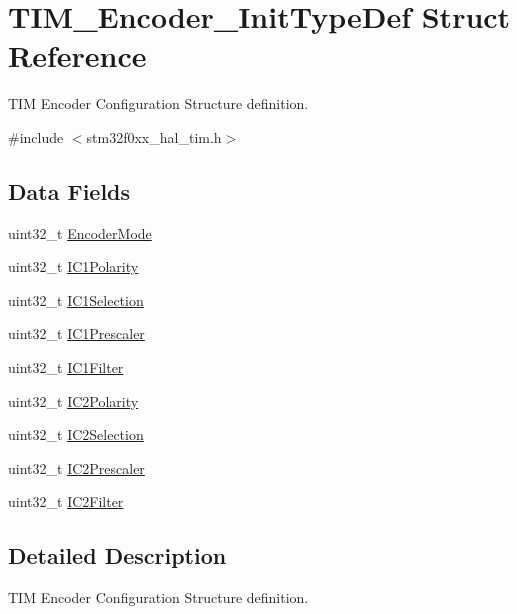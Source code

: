 \hypertarget{struct_t_i_m___encoder___init_type_def}{}\section{T\+I\+M\+\_\+\+Encoder\+\_\+\+Init\+Type\+Def Struct Reference}
\label{struct_t_i_m___encoder___init_type_def}


T\+IM Encoder Configuration Structure definition.  




{\ttfamily \#include $<$stm32f0xx\+\_\+hal\+\_\+tim.\+h$>$}

\subsection*{Data Fields}
\begin{DoxyCompactItemize}
\item 
uint32\+\_\+t \hyperlink{struct_t_i_m___encoder___init_type_def_ab451cb61e197d30ca8d3ce1c820ae1a4}{Encoder\+Mode}
\item 
uint32\+\_\+t \hyperlink{struct_t_i_m___encoder___init_type_def_ac1191c7421a3ca4c53ec7875870812e5}{I\+C1\+Polarity}
\item 
uint32\+\_\+t \hyperlink{struct_t_i_m___encoder___init_type_def_ae0c7ebe03057c1dd939555d1d924afd1}{I\+C1\+Selection}
\item 
uint32\+\_\+t \hyperlink{struct_t_i_m___encoder___init_type_def_aa913a8df0a4c97fefa87ff760fae10cb}{I\+C1\+Prescaler}
\item 
uint32\+\_\+t \hyperlink{struct_t_i_m___encoder___init_type_def_a5efa2ad5085fe72fb0b5dc2e2fc61def}{I\+C1\+Filter}
\item 
uint32\+\_\+t \hyperlink{struct_t_i_m___encoder___init_type_def_a67a8a854c58aedd9d37aa9f2ad4f49b4}{I\+C2\+Polarity}
\item 
uint32\+\_\+t \hyperlink{struct_t_i_m___encoder___init_type_def_af5b15660e7593a0fa62ee00059b3a9f4}{I\+C2\+Selection}
\item 
uint32\+\_\+t \hyperlink{struct_t_i_m___encoder___init_type_def_a0ce08ea64b9e8986336acf65fbfc1976}{I\+C2\+Prescaler}
\item 
uint32\+\_\+t \hyperlink{struct_t_i_m___encoder___init_type_def_ab64eaec6065c8729c961721901f6a8d7}{I\+C2\+Filter}
\end{DoxyCompactItemize}


\subsection{Detailed Description}
T\+IM Encoder Configuration Structure definition. 

